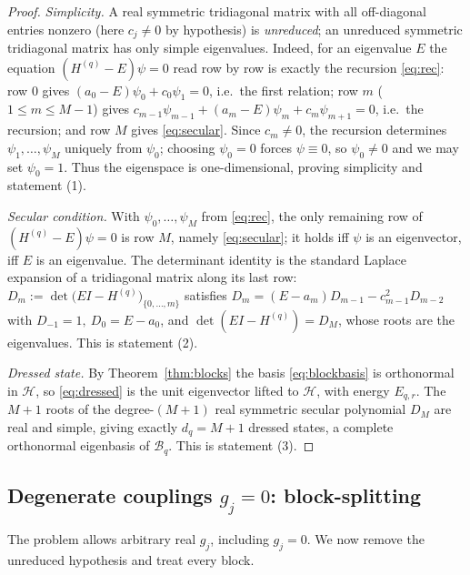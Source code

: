 \documentclass[12pt]{article}
\theoremstyle{definition}
\theoremstyle{remark}
\begin{document}
\begin{proof}
\emph{Simplicity.} A real symmetric tridiagonal matrix with all off-diagonal
entries nonzero (here $c_j\ne0$ by hypothesis) is \emph{unreduced}; an unreduced
symmetric tridiagonal matrix has only simple eigenvalues. Indeed, for an eigenvalue
$E$ the equation $(H^{(q)}-E)\psi=0$ read row by row is exactly the recursion
\eqref{eq:rec}: row $0$ gives $(a_0-E)\psi_0+c_0\psi_1=0$, i.e.\ the first relation;
row $m$ ($1\le m\le M-1$) gives $c_{m-1}\psi_{m-1}+(a_m-E)\psi_m+c_m\psi_{m+1}=0$,
i.e.\ the recursion; and row $M$ gives \eqref{eq:secular}. Since $c_m\neq0$, the
recursion determines $\psi_1,\dots,\psi_M$ uniquely from $\psi_0$; choosing
$\psi_0=0$ forces $\psi\equiv0$, so $\psi_0\neq0$ and we may set $\psi_0=1$. Thus
the eigenspace is one-dimensional, proving simplicity and statement (1).

\emph{Secular condition.} With $\psi_0,\dots,\psi_M$ from \eqref{eq:rec}, the only
remaining row of $(H^{(q)}-E)\psi=0$ is row $M$, namely \eqref{eq:secular}; it holds
iff $\psi$ is an eigenvector, iff $E$ is an eigenvalue. The determinant identity is
the standard Laplace expansion of a tridiagonal matrix along its last row:
$D_m:=\det\bigl(EI-H^{(q)}\bigr)_{\{0,\dots,m\}}$ satisfies
$D_m=(E-a_m)D_{m-1}-c_{m-1}^2D_{m-2}$ with $D_{-1}=1,\ D_0=E-a_0$, and
$\det(EI-H^{(q)})=D_M$, whose roots are the eigenvalues. This is statement (2).

\emph{Dressed state.} By Theorem~\ref{thm:blocks} the basis \eqref{eq:blockbasis} is
orthonormal in $\mathcal H$, so \eqref{eq:dressed} is the unit eigenvector lifted to
$\mathcal H$, with energy $E_{q,r}$. The $M+1$ roots of the degree-$(M+1)$ real
symmetric secular polynomial $D_M$ are real and simple, giving exactly $d_q=M+1$
dressed states, a complete orthonormal eigenbasis of $\mathcal B_q$. This is
statement (3).
\end{proof}

\subsection{Degenerate couplings $g_j=0$: block-splitting}\label{sec:degenerate}

The problem allows arbitrary real $g_j$, including $g_j=0$. We now remove the
unreduced hypothesis and treat every block.
\end{document}
